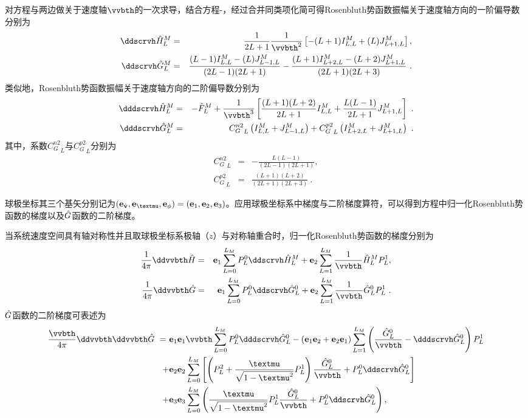   对方程与两边做关于速度轴$\vvbth$的一次求导，结合方程-，经过合并同类项化简可得Rosenbluth势函数振幅关于速度轴方向的一阶偏导数分别为
  \begin{eqnarray}
      \ddscrvh \Hhlm &=& \frac{1}{2 L + 1} \frac{1}{\vvbth^2} \left [-(L+1) \ILFhlm + (L) \JLpFhlm \right] , \label{dvHhLM} \\
      \ddscrvh \Ghlm &=& \frac{(L-1) \ILFhlm - (L) \JLnFhlm}{(2 L -1) (2 L +1 )} - \frac{(L+1) \ILIIFhlm - (L+2) \JLpFhlm}{(2 L + 1) (2 L + 3 )} ~. \label{dvGhLM}
  \end{eqnarray}
  类似地，Rosenbluth势函数振幅关于速度轴方向的二阶偏导数分别为
  \begin{eqnarray}
      \dddscrvh \Hhlm &=& - \Fhlm + \frac{1}{\vvbth^3} \left [\frac{(L+1) (L+2)}{2 L + 1} \ILFhlm + \frac{L (L-1) }{2 L + 1} \JLpFhlm \right] ~. \label{ddvHhLM} \\
      \dddscrvh \Ghlm &=& {C_G^{n2}}_L \left(\ILFhlm + \JLnFhlm \right) + {C_G^{p2}}_L \left(\ILIIFhlm + \JLpFhlm \right)~. \label{ddvGhLM}
  \end{eqnarray}
  其中，系数${C_G^{n2}}_L$与${C_G^{p2}}_L$分别为
  \begin{eqnarray}
      {C_G^{n2}}_L &= & - \frac{L(L-1)}{(2L-1) (2L+1)} , \label{CG2L} \\ 
      {C_G^{p2}}_L &= & \frac{(L+1) (L+2)}{(2L+1) (2L+3)}  ~. \label{CG2L2}
  \end{eqnarray}
  
    球极坐标其三个基矢分别记为$ \left(\bfe_{\vh}, \bfe_{\mu}, \bfe_{\phi} \right) = \left(\bfe_1, \bfe_2, \bfe_3 \right)$。应用球极坐标系中梯度与二阶梯度算符，可以得到方程中归一化Rosenbluth势函数的梯度以及$\hat{G}$函数的二阶梯度。

  当系统速度空间具有轴对称性并且取球极坐标系极轴（$z$）与对称轴重合时，归一化Rosenbluth势函数的梯度分别为
  \begin{eqnarray}
      \frac{1}{4\pi} \ddvvbth  \Hh &=& \ex \sumLoq \PL \ddscrvh \Hhlm + \ey \sumLIq \frac{1}{\vvbth} \Hhlm \PLI , \label{ddHhAxis} 
      \\
      \frac{1}{4\pi} \ddvvbth  \Gh &=& \ex \sumLoq \PL \ddscrvh \GhL + \ey \sumLIq \frac{1}{\vvbth} \GhL \PLI ~. \label{ddGhAxis}
  \end{eqnarray}
  $\hat{G}$函数的二阶梯度可表述为
  \begin{eqnarray}
  \begin{aligned}
      \frac{\vvbth}{4\pi} \ddvvbth \ddvvbth  \Gh \ = \ & \ex \ex \vvbth \sumLoq \PL \dddscrvh \GhL - 
      \left(\ex \ey + \ey \ex \right) \sumLIq \left ( \frac{\GhL}{\vvbth} - \dddscrvh \GhL \right ) \PLI 
      \\
      + &  \ey \ey \sumLoq \left[\left(\PLII + \frac{\mu}{\sinQ} \PLI \right) \frac{\GhL}{\vvbth} + \PL \ddscrvh \GhL \right] 
      \\
      + & \ez \ez \sumLoq \left (\frac{\mu}{\sinQ} \PLI \frac{\GhL}{\vvbth} +  \PL \ddscrvh \GhL \right) , \label{dddGhAxis} 
  \end{aligned}
  \end{eqnarray}

